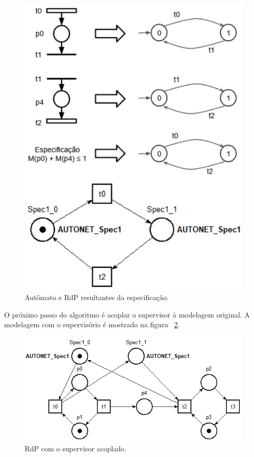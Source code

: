\begin{figure}[!htb]
	\caption[Aut\^omato e RdP resultantes da especifica\c{c}\~ao.]{Aut\^omato e RdP resultantes da especifica\c{c}\~ao.}
	\label{fig:pqnafabespec}
	\includegraphics[width=16cm]{./figuras/PQNAFABESPEC.png}\centering
\end{figure}

O pr\'oximo passo do algoritmo \'e acoplar o supervisor \`a modelagem original. A modelagem com o supervis\'orio \'e mostrado na figura ~\ref{fig:pqnafabsup}.

\begin{figure}[!htb]
	\caption[RdP com o supervisor acoplado.]{RdP com o supervisor acoplado.}
	\label{fig:pqnafabsup}
	\includegraphics[width=16cm]{./figuras/PQNAFABSUP.png}\centering
\end{figure}

